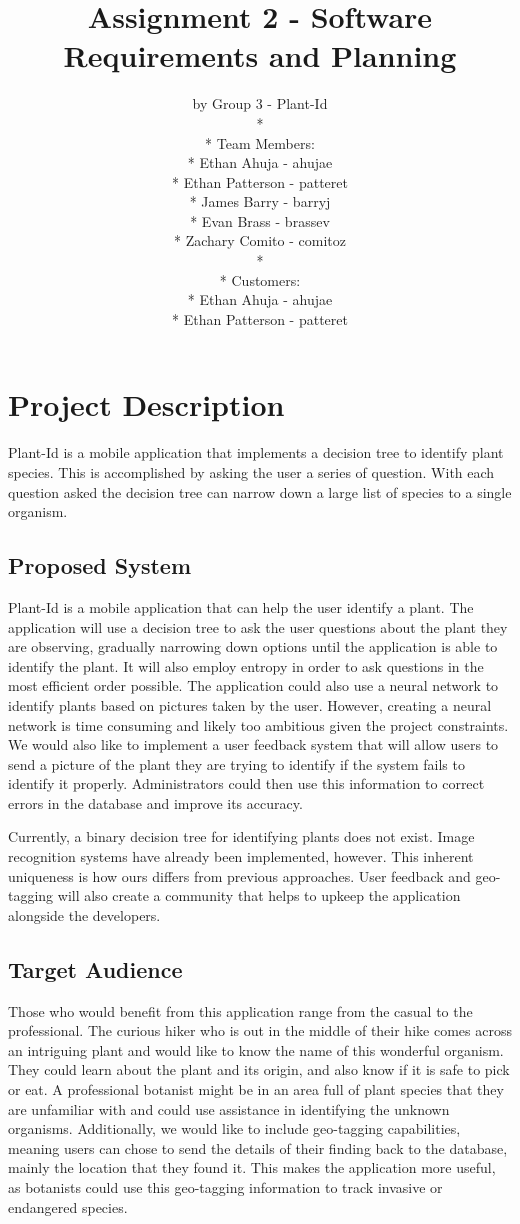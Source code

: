 \documentclass[a4paper]{article}
\title{Assignment 2 - Software Requirements and Planning}
\author{ by Group 3 - Plant-Id \\* \\* Team Members: \\* Ethan Ahuja - ahujae \\* Ethan Patterson - patteret \\* James Barry - barryj \\* Evan Brass - brassev \\* Zachary Comito - comitoz \\* \\* Customers: \\* Ethan Ahuja - ahujae \\* Ethan Patterson - patteret }
\begin{document}
\maketitle
\pagebreak
\tableofcontents
\pagebreak

\section{Project Description}
Plant-Id is a mobile application that implements a decision tree to identify plant species. This is accomplished by asking the user a series of question.  With each question asked the decision tree can narrow down a large list of species to a single organism.

\subsection{Proposed System}
Plant-Id is a mobile application that can help the user identify a plant. The application will use a decision tree to ask the user questions about the plant they are observing, gradually narrowing down options until the application is able to identify the plant. It will also employ entropy in order to ask questions in the most efficient order possible. The application could also use a neural network to identify plants based on pictures taken by the user. However, creating a neural network is time consuming and likely too ambitious given the project constraints. We would also like to implement a user feedback system that will allow users to send a picture of the plant they are trying to identify if the system fails to identify it properly. Administrators could then use this information to correct errors in the database and improve its accuracy. 

Currently, a binary decision tree for identifying plants does not exist. Image recognition systems have already been implemented, however. This inherent uniqueness is how ours differs from previous approaches. User feedback and geo-tagging will also create a community that helps to upkeep the application alongside the developers. 

\subsection{Target Audience}
Those who would benefit from this application range from the casual to the professional. The curious hiker who is out in the middle of their hike comes across an intriguing plant and would like to know the name of this wonderful organism. They could learn about the plant and its origin, and also know if it is safe to pick or eat. A professional botanist might be in an area full of plant species that they are unfamiliar with and could use assistance in identifying the unknown organisms.  Additionally, we would like to include geo-tagging capabilities, meaning users can chose to send the details of their finding back to the database, mainly the location that they found it. This makes the application more useful, as botanists could use this geo-tagging information to track invasive or endangered species.
\end{document}

